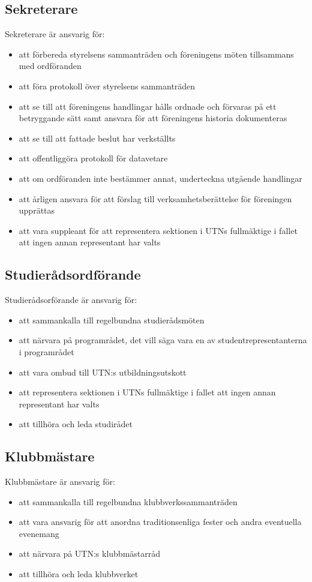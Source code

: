 \documentclass[a4paper]{article}
\begin{document}
{  \subsection{Sekreterare}
  Sekreterare är ansvarig för:
  \begin{itemize}
    \item att förbereda styrelsens sammanträden och föreningens möten tillsammans med ordföranden
    \item att föra protokoll över styrelsens sammanträden
    \item att se till att föreningens handlingar hålls ordnade och förvaras på ett betryggande sätt samt ansvara för att föreningens historia dokumenteras
    \item att se till att fattade beslut har verkställts
    \item att offentliggöra protokoll för datavetare
    \item att om ordföranden inte bestämmer annat, underteckna utgående handlingar
    \item att årligen ansvara för att förslag till verksamhetsberättelse för föreningen upprättas
    \item att vara suppleant för att representera sektionen i UTNs fullmäktige i fallet att ingen annan representant har valts
  \end{itemize}
  
  \subsection{Studierådsordförande}
  Studierådsorförande är ansvarig för:
  \begin{itemize}
    \item att sammankalla till regelbundna studierådsmöten
    \item att närvara på programrådet, det vill säga vara en av studentrepresentanterna i programrådet
    \item att vara ombud till UTN:s utbildningsutskott
    \item att representera sektionen i UTNs fullmäktige i fallet att ingen annan representant har valts
    \item att tillhöra och leda studirådet
  \end{itemize}
  
  \subsection{Klubbmästare}
  Klubbmästare är ansvarig för:
  \begin{itemize}
    \item att sammankalla till regelbundna klubbverkssammanträden
    \item att vara ansvarig för att anordna traditionsenliga fester och andra eventuella evenemang
    \item att närvara på UTN:s klubbmästarråd
    \item att tillhöra och leda klubbverket
  \end{itemize}
  
}
\end{document}
